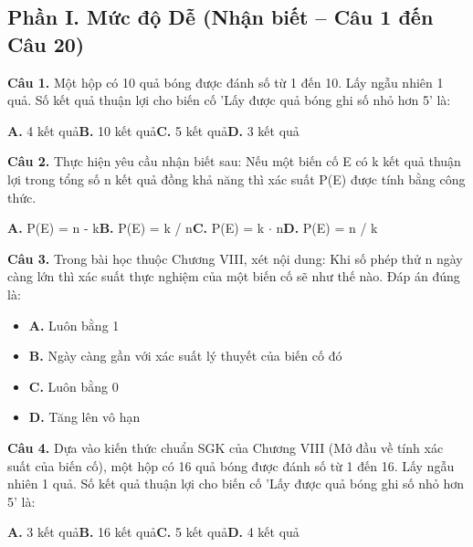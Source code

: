\documentclass[11pt,a4paper]{article}
\begin{document}
\subsection*{\color{accent} Phần I. Mức độ Dễ (Nhận biết -- Câu 1 đến Câu 20)}
\textbf{\color{primary} Câu 1.} Một hộp có 10 quả bóng được đánh số từ 1 đến 10. Lấy ngẫu nhiên 1 quả. Số kết quả thuận lợi cho biến cố 'Lấy được quả bóng ghi số nhỏ hơn 5' là:\par
\hspace*{1.5em}\textbf{A.} 4 kết quả\quad\quad \textbf{B.} 10 kết quả\quad\quad \textbf{C.} 5 kết quả\quad\quad \textbf{D.} 3 kết quả\par\vspace{2pt}
\textbf{\color{primary} Câu 2.} Thực hiện yêu cầu nhận biết sau: Nếu một biến cố E có k kết quả thuận lợi trong tổng số n kết quả đồng khả năng thì xác suất P(E) được tính bằng công thức.\par
\hspace*{1.5em}\textbf{A.} P(E) = n - k\quad\quad \textbf{B.} P(E) = k / n\quad\quad \textbf{C.} P(E) = k $\cdot$ n\quad\quad \textbf{D.} P(E) = n / k\par\vspace{2pt}
\textbf{\color{primary} Câu 3.} Trong bài học thuộc Chương VIII, xét nội dung: Khi số phép thử n ngày càng lớn thì xác suất thực nghiệm của một biến cố sẽ như thế nào. Đáp án đúng là:\par
\begin{itemize}\setlength{\itemsep}{1pt}\setlength{\parskip}{0pt}
  \item[] \textbf{A.} Luôn bằng 1
  \item[] \textbf{B.} Ngày càng gần với xác suất lý thuyết của biến cố đó
  \item[] \textbf{C.} Luôn bằng 0
  \item[] \textbf{D.} Tăng lên vô hạn
\end{itemize}\vspace{2pt}
\textbf{\color{primary} Câu 4.} Dựa vào kiến thức chuẩn SGK của Chương VIII (Mở đầu về tính xác suất của biến cố), một hộp có 16 quả bóng được đánh số từ 1 đến 16. Lấy ngẫu nhiên 1 quả. Số kết quả thuận lợi cho biến cố 'Lấy được quả bóng ghi số nhỏ hơn 5' là:\par
\hspace*{1.5em}\textbf{A.} 3 kết quả\quad\quad \textbf{B.} 16 kết quả\quad\quad \textbf{C.} 5 kết quả\quad\quad \textbf{D.} 4 kết quả\par\vspace{2pt}
\end{document}
